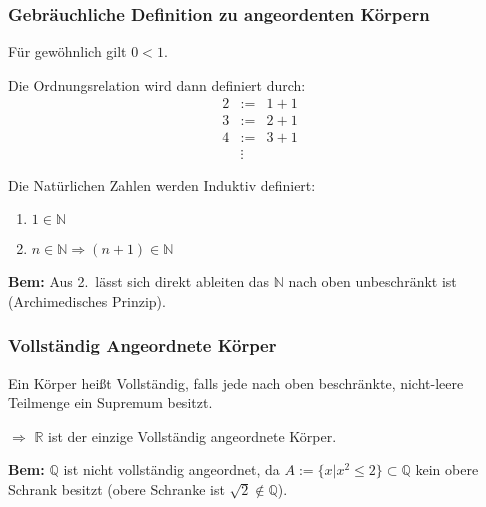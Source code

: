 \documentclass[10pt]{article}
\newcommand{\N}{\mathbb{N}}
\newcommand{\Q}{\mathbb{Q}}
\newcommand{\R}{\mathbb{R}}
\begin{document}
    \subsubsection{Gebräuchliche Definition zu angeordenten Körpern}
    Für gewöhnlich gilt $0<1$.

     Die Ordnungsrelation wird dann definiert durch:
    \begin{eqnarray*}
        2&:=& 1+1 \\
        3&:=& 2+1 \\
        4&:=&3+1 \\
        &\vdots&
    \end{eqnarray*}

     Die Natürlichen Zahlen werden Induktiv definiert:
    \begin{enumerate}
        \item $1 \in \mathbb{N}$
        \item $n \in \mathbb{N} \Rightarrow (n+1)\in\mathbb{N}$
    \end{enumerate}

    \textbf{Bem:}
    Aus 2.\ lässt sich direkt ableiten das $\N$ nach oben unbeschränkt ist (Archimedisches Prinzip).

    \subsubsection{Vollständig Angeordnete Körper}
    Ein Körper heißt Vollständig, falls jede nach oben beschränkte, nicht-leere
    Teilmenge ein Supremum besitzt.

    $\Rightarrow$ $\R$ ist der einzige Vollständig angeordnete Körper.

    \textbf{Bem:} $\Q$ ist nicht vollständig angeordnet, da
    $A := \{x | x^2 \leq 2\} \subset \mathbb{Q}$ kein obere Schrank besitzt
    (obere Schranke ist $\sqrt{2} \notin \mathbb{Q}$).
\end{document}
